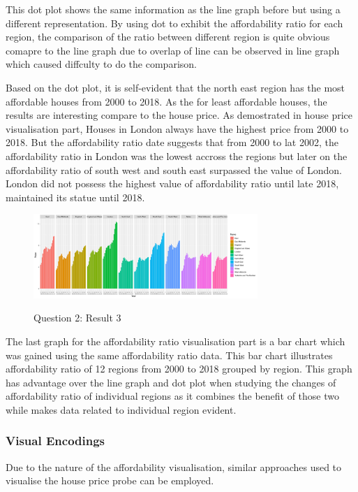 \documentclass{article}
\begin{document}
This dot plot shows the same information as the line graph before but using a different representation. 
By using dot to exhibit the affordability ratio for each region, the comparison of the ratio between different 
region is quite obvious comapre to the line graph due to overlap of line can be observed in line graph 
which caused diffculty to do the comparison.

Based on the dot plot, it is self-evident that the north east region has the most affordable houses from 2000 
to 2018. As the for least affordable houses, the results are interesting compare to the house price. 
As demostrated in house price visualisation part, Houses in London always have the highest price from 2000 to 2018.
But the affordability ratio date suggests that from 2000 to lat 2002, the affordability ratio in London was the lowest 
accross the regions but later on the affordability ratio of south west and south east surpassed the value of London. 
London did not possess the highest value of affordability ratio until late 2018, maintained its statue until 2018.


\begin{figure}[H]
  \begin{minipage}[b]{1.0\linewidth}
    \centering
    \centerline{\includegraphics[width=8.5cm]{Q2Geom_gridbar}}
    \centerline{Question 2: Result 3}\medskip
  \end{minipage}
\end{figure}

The last graph for the affordability ratio visualisation part is a bar chart which was gained using the same 
affordability ratio data. This bar chart illustrates affordability ratio of 12 regions from 2000 to 2018 
grouped by region. This graph has advantage over the line graph and dot plot when studying the changes of affordability ratio of individual 
regions as it combines the benefit of those two while makes data related to individual region evident.

\subsubsection{Visual Encodings}
Due to the nature of the affordability visualisation, similar approaches used to visualise the house price 
probe can be employed.
\end{document}
